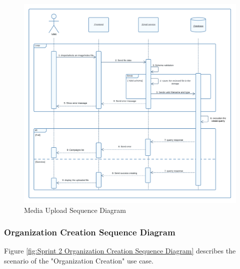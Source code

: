 \begin{figure}[ht]
	\centering
	\includegraphics[width=\linewidth]{Images/sprint2/upload media sequence diagram.png}
	\caption{ Media Upload Sequence Diagram}
	\label{fig:Sprint 2 Media Upload Sequence Diagram}
\end{figure}

\clearpage
\subsubsection{Organization Creation Sequence Diagram}

Figure \ref{fig:Sprint 2 Organization Creation Sequence Diagram} describes the scenario of the "Organization Creation" use case.

